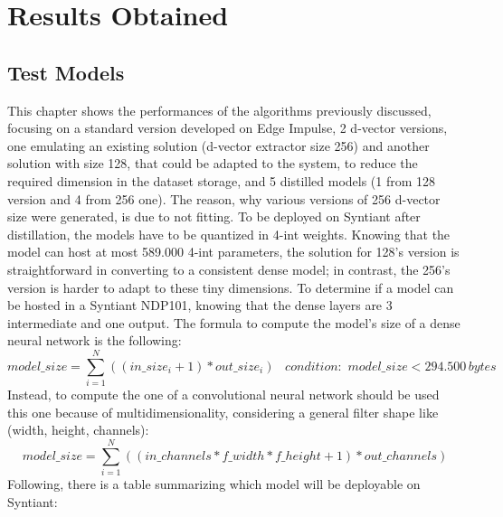 \chapter{Results Obtained}
\label{cha:results obtained}
\section{Test Models}
\label{sec:test models}
This chapter shows the performances of the algorithms previously discussed, focusing on a standard version developed on Edge Impulse\cite{edgeimpulse_kws_example}, 2 d-vector versions, one emulating an existing solution\cite{dvector_extractor_TinySV} (d-vector extractor size 256) and another solution with size 128, that could be adapted to the system, to reduce the required dimension in the dataset storage, and 5 distilled models (1 from 128 version and 4 from 256 one). The reason, why various versions of 256 d-vector size were generated, is due to not fitting. To be deployed on Syntiant after distillation, the models have to be quantized in 4-int weights. Knowing that the model can host at most 589.000 4-int parameters, the solution for 128's version is straightforward in converting to a consistent dense model; in contrast, the 256's version is harder to adapt to these tiny dimensions. To determine if a model can be hosted in a Syntiant NDP101, knowing that the dense layers are 3 intermediate and one output. The formula to compute the model's size of a dense neural network is the following:
\begin{equation*}
    model\_size=\sum_{i=1}^{N}((in\_size_i+1)*out\_size_i)\,\,\,\,\,condition:\,\,model\_size<294.500\,bytes
\end{equation*} 
Instead, to compute the one of a convolutional neural network should be used this one because of multidimensionality, considering a general filter shape like (width, height, channels):
\begin{equation*}
    model\_size=\sum_{i=1}^{N}((in\_channels*f\_width*f\_height+1)*out\_channels)
\end{equation*}
Following, there is a table summarizing which model will be deployable on Syntiant:
